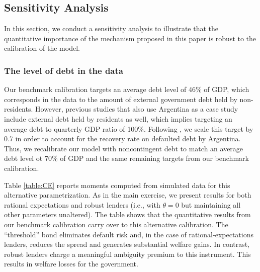 \subsection{Sensitivity Analysis \label{subsec:sensitivity}}

In this section, we conduct a sensitivity analysis to illustrate that the quantitative importance of the mechanism proposed in this paper is robust to the calibration of the model. 

\subsubsection{The level of debt in the data}

Our benchmark calibration targets an average debt level of 46\% of GDP, which corresponds in the data to the amount of external government debt held by non-residents. However, previous studies that also use Argentina as a case study include external debt held by residents as well, which implies targeting an average debt to quarterly GDP ratio of 100\%. Following \cite{Chatty}, we scale this target by 0.7 in order to account for the recovery rate on defaulted debt by Argentina. Thus, we recalibrate our model with noncontingent debt to match an average debt level ot 70\% of GDP and the same remaining targets from our benchmark calibration.

Table \ref{table:CE} reports moments computed from simulated data for this alternative parametrization. As in the main exercise, we present results for both rational expectations and robust lenders (i.e., with $\theta=0$ but maintaining all other parameters unaltered). The table shows that the quantitative results from our benchmark calibration carry over to this alternative calibration. The ``threshold'' bond eliminates default risk and, in the case of rational-expectations lenders, reduces the spread and generates substantial welfare gains. In contrast, robust lenders charge a meaningful ambiguity premium to this instrument. This results in welfare losses for the government.

